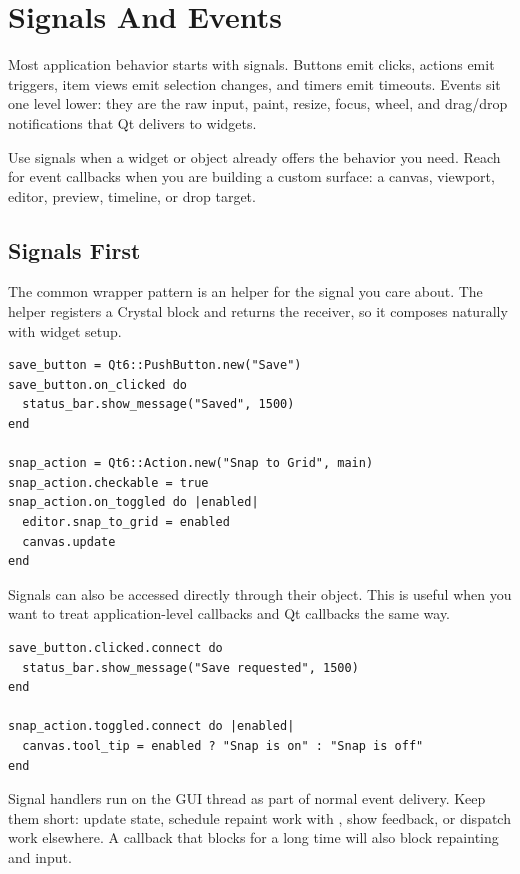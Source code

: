 \chapter{Signals And Events}

Most application behavior starts with signals. Buttons emit clicks, actions emit triggers, item views emit selection changes, and timers emit timeouts. Events sit one level lower: they are the raw input, paint, resize, focus, wheel, and drag/drop notifications that Qt delivers to widgets.

Use signals when a widget or object already offers the behavior you need. Reach for event callbacks when you are building a custom surface: a canvas, viewport, editor, preview, timeline, or drop target.

\section{Signals First}

The common wrapper pattern is an  helper for the signal you care about. The helper registers a Crystal block and returns the receiver, so it composes naturally with widget setup.

\begin{lstlisting}[style=crystal]
save_button = Qt6::PushButton.new("Save")
save_button.on_clicked do
  status_bar.show_message("Saved", 1500)
end

snap_action = Qt6::Action.new("Snap to Grid", main)
snap_action.checkable = true
snap_action.on_toggled do |enabled|
  editor.snap_to_grid = enabled
  canvas.update
end
\end{lstlisting}

Signals can also be accessed directly through their  object. This is useful when you want to treat application-level callbacks and Qt callbacks the same way.

\begin{lstlisting}[style=crystal]
save_button.clicked.connect do
  status_bar.show_message("Save requested", 1500)
end

snap_action.toggled.connect do |enabled|
  canvas.tool_tip = enabled ? "Snap is on" : "Snap is off"
end
\end{lstlisting}

Signal handlers run on the GUI thread as part of normal event delivery. Keep them short: update state, schedule repaint work with , show feedback, or dispatch work elsewhere. A callback that blocks for a long time will also block repainting and input.

